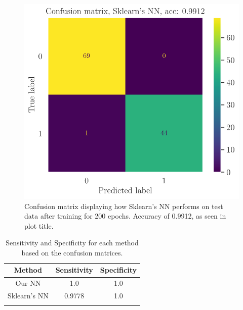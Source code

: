 \begin{figure}
    \centering
    \includegraphics[width=0.99\linewidth]{latex/figures/sklearnWBC_final_ADAM_relu6-100_sigmoid-2.pdf}
    \caption{Confusion matrix displaying how Sklearn's NN performs on test data after training for 200 epochs. Accuracy of 0.9912, as seen in plot title.}
    \label{fig:sklearns confusion matrix}
\end{figure}

\begin{table}[h!]
\centering
\begin{tabular}{ccc}
\hline
\textbf{Method} & \textbf{Sensitivity} & \textbf{Specificity} \\
\hline
Our NN          & 1.0                           & 1.0                  \\
Sklearn's NN    & 0.9778                        & 1.0                  \\
\hline
\label{table:sensitivity and specificity}
\end{tabular}
\caption{Sensitivity and Specificity for each method based on the confusion matrices.}
\end{table}

